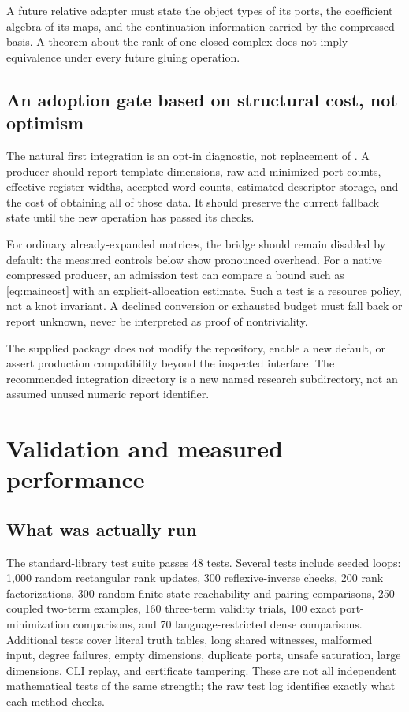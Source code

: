 \documentclass[11pt,letterpaper]{article}
\newcommand{\code}[1]{\texttt{\detokenize{#1}}}
\theoremstyle{definition}
\theoremstyle{remark}
\numberwithin{equation}{section}
\begin{document}
A future relative adapter must state the object types of its ports,
the coefficient algebra of its maps, and the continuation information
carried by the compressed basis. A theorem about the rank of one closed
complex does not imply equivalence under every future gluing operation.

\subsection{An adoption gate based on structural cost, not optimism}
The natural first integration is an opt-in diagnostic, not replacement of
\code{scan_fast.py}. A producer should report template dimensions, raw
and minimized port counts, effective register widths, accepted-word
counts, estimated descriptor storage, and the cost of obtaining all of
those data. It should preserve the current fallback state until the new
operation has passed its checks.

For ordinary already-expanded matrices, the bridge should remain disabled
by default: the measured controls below show pronounced overhead. For a
native compressed producer, an admission test can compare a bound such
as \eqref{eq:maincost} with an explicit-allocation estimate. Such a test
is a resource policy, not a knot invariant. A declined conversion or
exhausted budget must fall back or report unknown, never be interpreted
as proof of nontriviality.

The supplied package does not modify the repository, enable a new default,
or assert production compatibility beyond the inspected interface. The
recommended integration directory is a new named research subdirectory,
not an assumed unused numeric report identifier.

\section{Validation and measured performance}
\label{sec:experiments}

\subsection{What was actually run}
The standard-library test suite passes 48 tests. Several tests include
seeded loops: 1,000 random rectangular rank updates, 300 reflexive-inverse
checks, 200 rank factorizations, 300 random finite-state reachability and
pairing comparisons, 250 coupled two-term examples, 160 three-term
validity trials, 100 exact port-minimization comparisons, and 70
language-restricted dense comparisons. Additional tests cover literal
truth tables, long shared witnesses, malformed input, degree failures,
empty dimensions, duplicate ports, unsafe saturation, large dimensions,
CLI replay, and certificate tampering. These are not all independent
mathematical tests of the same strength; the raw test log identifies
exactly what each method checks.
\end{document}
